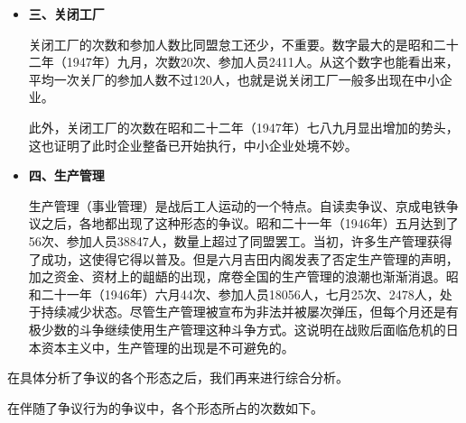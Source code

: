 \documentclass[a4paper,12pt]{article}
\begin{document}
\begin{itemize}
\item \textbf{三、关闭工厂}

  关闭工厂的次数和参加人数比同盟怠工还少，不重要。数字最大的是昭和二十二年（1947年）九月，次数20次、参加人员2411人。从这个数字也能看出来，平均一次关厂的参加人数不过120人，也就是说关闭工厂一般多出现在中小企业。

  此外，关闭工厂的次数在昭和二十二年（1947年）七八九月显出增加的势头，这也证明了此时企业整备已开始执行，中小企业处境不妙。
  
\item \textbf{四、生产管理}
  
  生产管理（事业管理）是战后工人运动的一个特点。自读卖争议、京成电铁争议之后，各地都出现了这种形态的争议。昭和二十一年（1946年）五月达到了56次、参加人员38847人，数量上超过了同盟罢工。当初，许多生产管理获得了成功，这使得它得以普及。但是六月吉田内阁发表了否定生产管理的声明，加之资金、资材上的龃龉的出现，席卷全国的生产管理的浪潮也渐渐消退。昭和二十一年（1946年）六月44次、参加人员18056人，七月25次、2478人，处于持续减少状态。尽管生产管理被宣布为非法并被屡次弹压，但每个月还是有极少数的斗争继续使用生产管理这种斗争方式。这说明在战败后面临危机的日本资本主义中，生产管理的出现是不可避免的。
  
\end{itemize}

在具体分析了争议的各个形态之后，我们再来进行综合分析。

在伴随了争议行为的争议中，各个形态所占的次数如下。
\end{document}

